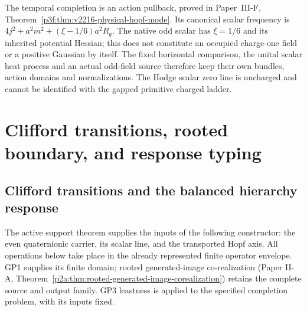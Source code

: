 \documentclass[12pt,a4paper]{article}
\begin{document}
The temporal completion is an action pullback, proved in Paper~III-F,
Theorem~\ref{p3f:thm:v2216-physical-hopf-mode}.  Its canonical scalar
frequency is $4j^2+a^2m^2+(\xi-1/6)a^2R_g$.  The native odd scalar
has $\xi=1/6$ and its inherited potential Hessian; this does not
constitute an occupied charge-one field or a positive Gaussian by itself.
The fixed horizontal comparison, the unital scalar heat process and an
actual odd-field source therefore keep their own bundles, action domains
and normalizations.  The Hodge scalar zero line is uncharged and cannot
be identified with the gapped primitive charged ladder.


\section{Clifford transitions, rooted boundary, and response typing}
\label{paper3c:sec:organized-response}
\subsection{Clifford transitions and the balanced hierarchy response}
\label{p3c:sec:v179-clifford-transition-response}

The active support theorem supplies the inputs of the following constructor:
the even quaternionic carrier, its scalar line, and the transported Hopf axis.
All operations below take place in the already represented finite operator
envelope.  GP1 supplies its finite domain; rooted generated-image
co-realization (Paper II-A,
Theorem~\ref{p2a:thm:rooted-generated-image-corealization}) retains the
complete source and output family.  GP3 leastness is applied to the specified
completion problem, with its inputs fixed.
\end{document}

